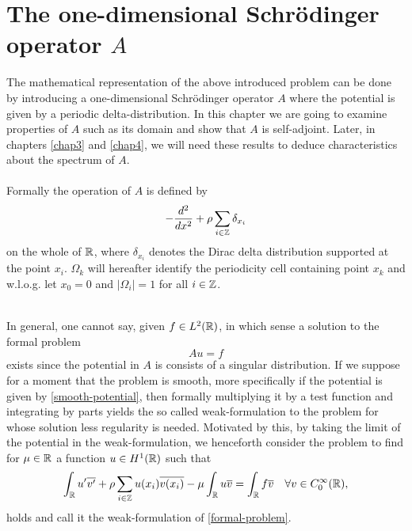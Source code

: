 \chapter{The one-dimensional Schrödinger operator $A$} \label{chap2}

The mathematical representation of the above introduced problem can be done by introducing a one-dimensional Schrödinger operator $A$ where the potential is given by a periodic delta-distribution. In this chapter we are going to examine properties of $A$ such as its domain and show that $A$ is self-adjoint. Later, in chapters \ref{chap3} and \ref{chap4}, we will need these results to deduce characteristics about the spectrum of $A$.
~\\ ~\\
Formally the operation of $A$ is defined by
\begin{equation}
	- \frac{d^{2}}{dx^{2}} + \rho \sum_{i \in \mathbb{Z}} \delta_{x_{i}} \label{the-operator-A-formally}
\end{equation}
on the whole of $\mathbb{R}$, where $\delta_{x_{i}}$ denotes the Dirac delta distribution supported at the point $x_{i}$. $\Omega_{k}$ will hereafter identify the periodicity cell containing point $x_{k}$ and w.l.o.g. let $x_{0} = 0$ and $|\Omega_{i}| = 1$ for all $i \in \mathbb{Z}$.

~\\  
In general, one cannot say, given $f \in L^{2}(\mathbb{R})$, in which sense a solution to the formal problem 
	\begin{equation}
		Au = f \label{formal-problem}
	\end{equation}
	exists since the potential in $A$ is consists of a singular distribution. If we suppose for a moment that the problem is smooth, more specifically if the potential is given by \eqref{smooth-potential}, then formally multiplying it by a test function and integrating by parts yields the so called weak-formulation to the problem for whose solution less regularity is needed. Motivated by this, by taking the limit of the potential in the weak-formulation, we henceforth consider the problem to find for $\mu \in \mathbb{R}$ a function $u \in H^{1}(\mathbb{R})$ such that
\begin{equation}
	\int_{\mathbb{R}} u' \overline{v'} + \rho \sum_{i \in \mathbb{Z}} u(x_{i}) \overline{v(x_{i})} - \mu \int_{\mathbb{R}} u \overline{v} = \int_{\mathbb{R}} f \overline{v} \quad \forall v \in C_{0}^{\infty}(\mathbb{R}), \label{weak-formulation-of-A}
\end{equation}	
holds and call it the weak-formulation of \eqref{formal-problem}.

